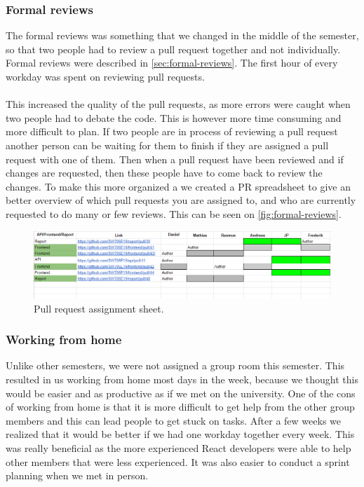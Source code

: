 \subsubsection{Formal reviews}
The formal reviews was something that we changed in the middle of the semester, so that two people had to review a pull request together and not individually.
Formal reviews were described in \autoref{sec:formal-reviews}.
The first hour of every workday was spent on reviewing pull requests.
\\\\
This increased the quality of the pull requests, as more errors were caught when two people had to debate the code.
This is however more time consuming and more difficult to plan.
If two people are in process of reviewing a pull request another person can be waiting for them to finish if they are assigned a pull request with one of them. 
Then when a pull request have been reviewed and if changes are requested, then these people have to come back to review the changes.
To make this more organized a we created a PR spreadsheet to give an better overview of which pull requests you are assigned to, and who are currently requested to do many or few reviews.
This can be seen on \autoref{fig:formal-reviews}.
\begin{figure}[H]
    \centering
    \includegraphics[width=\linewidth]{figures/formal-reviews.PNG}
    \caption{Pull request assignment sheet.}
    \label{fig:formal-reviews}
\end{figure}

\subsubsection{Working from home}
Unlike other semesters, we were not assigned a group room this semester.
This resulted in us working from home most days in the week, because we thought this would be easier and as productive as if we met on the university.
One of the cons of working from home is that it is more difficult to get help from the other group members and this can lead people to get stuck on tasks.
After a few weeks we realized that it would be better if we had one workday together every week.
This was really beneficial as the more experienced React developers were able to help other members that were less experienced.
It was also easier to conduct a sprint planning when we met in person.


